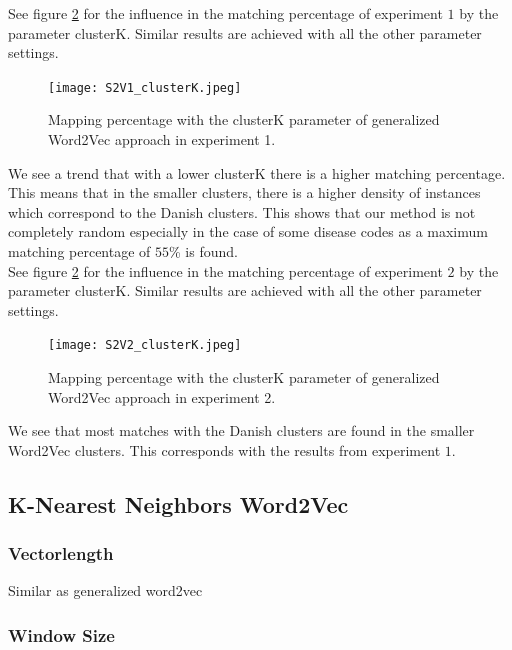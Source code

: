 See figure \ref{fig:s2v_vl_1} for the influence in the matching percentage of experiment $1$ by the parameter clusterK. Similar results are achieved with all the other parameter settings. \\

\begin{figure}[!htb]
	\centering
	\texttt{[image: S2V1\_clusterK.jpeg]}
	\caption{Mapping percentage with the clusterK parameter of generalized Word2Vec approach in experiment 1.}
	\label{fig:s2v_vl_1}
\end{figure}

\noindent We see a trend that with a lower clusterK there is a higher matching percentage. This means that in the smaller clusters, there is a higher density of instances which correspond to the Danish clusters. This shows that our method is not completely random especially in the case of some disease codes as a maximum matching percentage of $55$\% is found. \\

\noindent See figure \ref{fig:s2v_vl_1} for the influence in the matching percentage of experiment $2$ by the parameter clusterK. Similar results are achieved with all the other parameter settings. \\

\begin{figure}[!htb]
	\centering
	\texttt{[image: S2V2\_clusterK.jpeg]}
	\caption{Mapping percentage with the clusterK parameter of generalized Word2Vec approach in experiment 2.}
	\label{fig:s2v_vl_1}
\end{figure}

\noindent We see that most matches with the Danish clusters are found in the smaller Word2Vec clusters. This corresponds with the results from experiment $1$.

\subsection{K-Nearest Neighbors Word2Vec}

\subsubsection*{Vectorlength}

Similar as generalized word2vec

\subsubsection*{Window Size}

